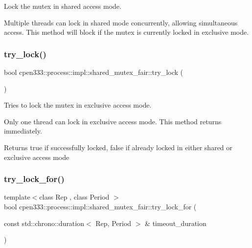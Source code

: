 Lock the mutex in shared access mode. 

Multiple threads can lock in shared mode concurrently, allowing simultaneous access. This method will block if the mutex is currently locked in exclusive mode. \mbox{\label{classcpen333_1_1process_1_1impl_1_1shared__mutex__fair_aaac6ea293ec760cb35eefeb004503e9a}} 
\subsubsection{\texorpdfstring{try\+\_\+lock()}{try\_lock()}}
{\footnotesize\ttfamily bool cpen333\+::process\+::impl\+::shared\+\_\+mutex\+\_\+fair\+::try\+\_\+lock (\begin{DoxyParamCaption}{ }\end{DoxyParamCaption})\hspace{0.3cm}{\ttfamily [inline]}}



Tries to lock the mutex in exclusive access mode. 

Only one thread can lock in exclusive access mode. This method returns immediately.

\begin{DoxyReturn}{Returns}
true if successfully locked, false if already locked in either shared or exclusive access mode 
\end{DoxyReturn}
\mbox{\label{classcpen333_1_1process_1_1impl_1_1shared__mutex__fair_a949f9ed2c12c14bd2cade7ec96dd3adb}} 
\subsubsection{\texorpdfstring{try\+\_\+lock\+\_\+for()}{try\_lock\_for()}}
{\footnotesize\ttfamily template$<$class Rep , class Period $>$ \\
bool cpen333\+::process\+::impl\+::shared\+\_\+mutex\+\_\+fair\+::try\+\_\+lock\+\_\+for (\begin{DoxyParamCaption}\item[{const std\+::chrono\+::duration$<$ Rep, Period $>$ \&}]{timeout\+\_\+duration }\end{DoxyParamCaption})\hspace{0.3cm}{\ttfamily [inline]}}



